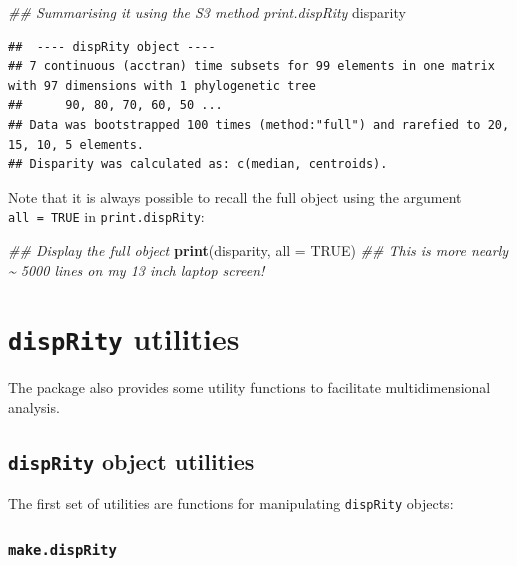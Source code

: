 \documentclass[
]{book}
\newenvironment{Shaded}{\begin{snugshade}}{\end{snugshade}}
\newcommand{\CommentTok}[1]{\textcolor[rgb]{0.56,0.35,0.01}{\textit{#1}}}
\newcommand{\DataTypeTok}[1]{\textcolor[rgb]{0.13,0.29,0.53}{#1}}
\newcommand{\KeywordTok}[1]{\textcolor[rgb]{0.13,0.29,0.53}{\textbf{#1}}}
\newcommand{\NormalTok}[1]{#1}
\newcommand{\OtherTok}[1]{\textcolor[rgb]{0.56,0.35,0.01}{#1}}
\begin{document}
\begin{Shaded}
\begin{Highlighting}[]
\CommentTok{\#\# Summarising it using the S3 method print.dispRity}
\NormalTok{disparity}
\end{Highlighting}
\end{Shaded}

\begin{verbatim}
##  ---- dispRity object ---- 
## 7 continuous (acctran) time subsets for 99 elements in one matrix with 97 dimensions with 1 phylogenetic tree
##      90, 80, 70, 60, 50 ...
## Data was bootstrapped 100 times (method:"full") and rarefied to 20, 15, 10, 5 elements.
## Disparity was calculated as: c(median, centroids).
\end{verbatim}

Note that it is always possible to recall the full object using the argument \texttt{all\ =\ TRUE} in \texttt{print.dispRity}:

\begin{Shaded}
\begin{Highlighting}[]
\CommentTok{\#\# Display the full object}
\KeywordTok{print}\NormalTok{(disparity, }\DataTypeTok{all =} \OtherTok{TRUE}\NormalTok{)}
\CommentTok{\#\# This is more nearly \textasciitilde{} 5000 lines on my 13 inch laptop screen!}
\end{Highlighting}
\end{Shaded}

\hypertarget{utilities}{%
\section{\texorpdfstring{\texttt{dispRity} utilities}{dispRity utilities}}\label{utilities}}

The package also provides some utility functions to facilitate multidimensional analysis.

\hypertarget{disprity-object-utilities}{%
\subsection{\texorpdfstring{\texttt{dispRity} object utilities }{dispRity object utilities }}\label{disprity-object-utilities}}

The first set of utilities are functions for manipulating \texttt{dispRity} objects:

\hypertarget{make.disprity}{%
\subsubsection{\texorpdfstring{\texttt{make.dispRity}}{make.dispRity}}\label{make.disprity}}
\end{document}
